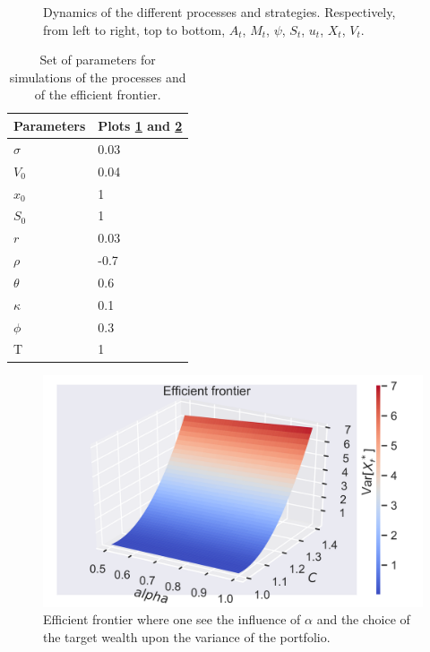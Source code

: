 \begin{figure}
\caption{Dynamics of the different processes and strategies. Respectively, from left to right, top to bottom, $A_t$, $M_t$, $\psi$, $S_t$, $u_t$, $X_t$, $V_t$.}
\label{fig:dynamics}
\end{figure}









\begin{table}
\begin{center}
\begin{tabular}{   m{4.5 cm} | m{4.5 cm}   } 
\hline
 Parameters & Plots  \ref{fig:dynamics} and \ref{fig:efficientfrontier}  \\ 
\hline
\hline
$\sigma$ & 0.03  \\
\hline
$V_0$ &  0.04 \\
\hline
$x_0$ &  1 \\
\hline
$S_0$ & 1 \\
\hline
$r$ & 0.03 \\
\hline
$\rho$ & -0.7\\
\hline
$\theta$  & 0.6  \\
\hline
$\kappa$ & 0.1 \\
\hline
$\phi$ & 0.3  \\
\hline
T & 1 \\
\hline
\end{tabular}
\caption{Set of parameters for simulations of the processes and of the efficient frontier.}
\label{tab:coef3}
\end{center}
\end{table}







\begin{figure}
\centering
\includegraphics[width = 0.5 \textwidth]{../addition_part/images/numerical_studies/efficient_frontier.png}
\caption{Efficient frontier where one see the influence of $\alpha$ and the choice of the target wealth upon the variance of the portfolio.}
\label{fig:efficientfrontier}
\end{figure}














